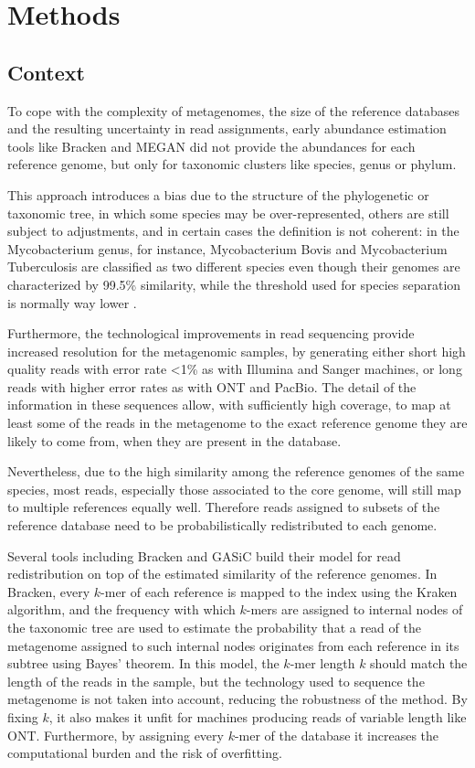 
\chapter{Methods}
\label{Chapter3}

\section{Context}

To cope with the complexity of metagenomes, the size of the reference databases and the resulting uncertainty in read assignments, early abundance estimation tools like Bracken \cite{lu_bracken:_2017} and MEGAN \cite{huson_megan_2007} did not provide the abundances for each reference genome, but only for taxonomic clusters like species, genus or phylum.

This approach introduces a bias due to the structure of the phylogenetic or taxonomic tree, in which some species may be over-represented, others are still subject to adjustments, and in certain cases the definition is not coherent: in the Mycobacterium genus, for instance, Mycobacterium Bovis and Mycobacterium Tuberculosis are classified as two different species even though their genomes are characterized by 99.5\% similarity, while the threshold used for species separation is normally way lower \cite{garnier_complete_2003}.

Furthermore, the technological improvements in read sequencing provide increased resolution for the metagenomic samples, by generating either short high quality reads with error rate <1\% as with Illumina and Sanger machines, or long reads with higher error rates as with ONT and PacBio. The detail of the information in these sequences allow, with sufficiently high coverage, to map at least some of the reads in the metagenome to the exact reference genome they are likely to come from, when they are present in the database.

Nevertheless, due to the high similarity among the reference genomes of the same species, most reads, especially those associated to the core genome, will still map to multiple references equally well. Therefore reads assigned to subsets of the reference database need to be probabilistically redistributed to each genome.

Several tools including Bracken and GASiC build their model for read redistribution on top of the estimated similarity of the reference genomes. In Bracken, every $k$-mer of each reference is mapped to the index using the Kraken algorithm, and the frequency with which $k$-mers are assigned to internal nodes of the taxonomic tree are used to estimate the probability that a read of the metagenome assigned to such internal nodes originates from each reference in its subtree using Bayes' theorem. In this model, the $k$-mer length $k$ should match the length of the reads in the sample, but the technology used to sequence the metagenome is not taken into account, reducing the robustness of the method. By fixing $k$, it also makes it unfit for machines producing reads of variable length like ONT. Furthermore, by assigning every $k$-mer of the database it increases the computational burden and the risk of overfitting.

